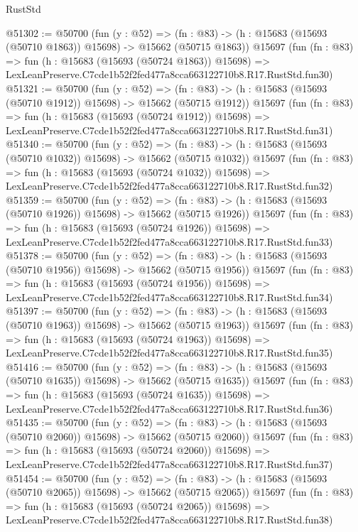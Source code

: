 \begin{lexlean}{RustStd}
\begin{coremodule}
@51302 := @50700
    (fun (y : @52) =>
    (fn : @83) -> (h : @15683 (@15693 (@50710 @1863)) @15698) -> @15662 (@50715 @1863))
    @15697
    (fun (fn : @83) =>
    fun (h : @15683 (@15693 (@50724 @1863)) @15698) =>
    LexLeanPreserve.C7cde1b52f2fed477a8cca663122710b8.R17.RustStd.fun30)
@51321 := @50700
    (fun (y : @52) =>
    (fn : @83) -> (h : @15683 (@15693 (@50710 @1912)) @15698) -> @15662 (@50715 @1912))
    @15697
    (fun (fn : @83) =>
    fun (h : @15683 (@15693 (@50724 @1912)) @15698) =>
    LexLeanPreserve.C7cde1b52f2fed477a8cca663122710b8.R17.RustStd.fun31)
@51340 := @50700
    (fun (y : @52) =>
    (fn : @83) -> (h : @15683 (@15693 (@50710 @1032)) @15698) -> @15662 (@50715 @1032))
    @15697
    (fun (fn : @83) =>
    fun (h : @15683 (@15693 (@50724 @1032)) @15698) =>
    LexLeanPreserve.C7cde1b52f2fed477a8cca663122710b8.R17.RustStd.fun32)
@51359 := @50700
    (fun (y : @52) =>
    (fn : @83) -> (h : @15683 (@15693 (@50710 @1926)) @15698) -> @15662 (@50715 @1926))
    @15697
    (fun (fn : @83) =>
    fun (h : @15683 (@15693 (@50724 @1926)) @15698) =>
    LexLeanPreserve.C7cde1b52f2fed477a8cca663122710b8.R17.RustStd.fun33)
@51378 := @50700
    (fun (y : @52) =>
    (fn : @83) -> (h : @15683 (@15693 (@50710 @1956)) @15698) -> @15662 (@50715 @1956))
    @15697
    (fun (fn : @83) =>
    fun (h : @15683 (@15693 (@50724 @1956)) @15698) =>
    LexLeanPreserve.C7cde1b52f2fed477a8cca663122710b8.R17.RustStd.fun34)
@51397 := @50700
    (fun (y : @52) =>
    (fn : @83) -> (h : @15683 (@15693 (@50710 @1963)) @15698) -> @15662 (@50715 @1963))
    @15697
    (fun (fn : @83) =>
    fun (h : @15683 (@15693 (@50724 @1963)) @15698) =>
    LexLeanPreserve.C7cde1b52f2fed477a8cca663122710b8.R17.RustStd.fun35)
@51416 := @50700
    (fun (y : @52) =>
    (fn : @83) -> (h : @15683 (@15693 (@50710 @1635)) @15698) -> @15662 (@50715 @1635))
    @15697
    (fun (fn : @83) =>
    fun (h : @15683 (@15693 (@50724 @1635)) @15698) =>
    LexLeanPreserve.C7cde1b52f2fed477a8cca663122710b8.R17.RustStd.fun36)
@51435 := @50700
    (fun (y : @52) =>
    (fn : @83) -> (h : @15683 (@15693 (@50710 @2060)) @15698) -> @15662 (@50715 @2060))
    @15697
    (fun (fn : @83) =>
    fun (h : @15683 (@15693 (@50724 @2060)) @15698) =>
    LexLeanPreserve.C7cde1b52f2fed477a8cca663122710b8.R17.RustStd.fun37)
@51454 := @50700
    (fun (y : @52) =>
    (fn : @83) -> (h : @15683 (@15693 (@50710 @2065)) @15698) -> @15662 (@50715 @2065))
    @15697
    (fun (fn : @83) =>
    fun (h : @15683 (@15693 (@50724 @2065)) @15698) =>
    LexLeanPreserve.C7cde1b52f2fed477a8cca663122710b8.R17.RustStd.fun38)

\end{coremodule}
\end{lexlean}
